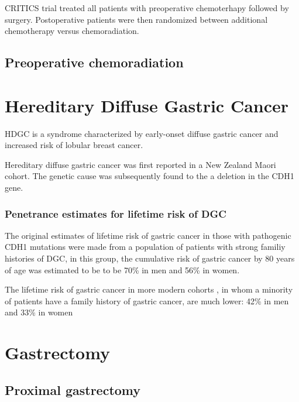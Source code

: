 \documentclass[
]{book}
\begin{document}
CRITICS trial treated all patients with preoperative chemoterhapy followed by surgery. Postoperative patients were then randomized between additional chemotherapy versus chemoradiation.

\hypertarget{preoperative-chemoradiation}{%
\section{Preoperative chemoradiation}\label{preoperative-chemoradiation}}

\citep{ajani3953}

\hypertarget{hereditary-diffuse-gastric-cancer}{%
\chapter{Hereditary Diffuse Gastric Cancer}\label{hereditary-diffuse-gastric-cancer}}

HDGC is a syndrome characterized by early-onset diffuse gastric cancer and increased risk of lobular breast cancer.

Hereditary diffuse gastric cancer was first reported in a New Zealand Maori cohort. The genetic cause was subsequently found to the a deletion in the CDH1 gene.

\hypertarget{penetrance-estimates-for-lifetime-risk-of-dgc}{%
\subsection{Penetrance estimates for lifetime risk of DGC}\label{penetrance-estimates-for-lifetime-risk-of-dgc}}

The original estimates of lifetime risk of gastric cancer in those with pathogenic CDH1 mutations were made from a population of patients with strong familiy histories of DGC\citep{hansford23}, in this group,
the cumulative risk of gastric cancer by 80 years of age was estimated to be to be 70\% in men and 56\% in women.

The lifetime risk of gastric cancer in more modern cohorts\citep{roberts1325} \citep{xicola838}, in whom a minority of patients have a family history of gastric cancer, are much lower: 42\% in men and 33\% in women

\hypertarget{gastrectomy}{%
\chapter{Gastrectomy}\label{gastrectomy}}

\hypertarget{proximal-gastrectomy}{%
\section{Proximal gastrectomy}\label{proximal-gastrectomy}}
\end{document}
